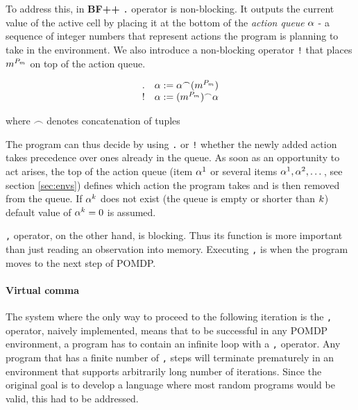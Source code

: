 To address this, in \textbf{BF++} \texttt{.} operator is non-blocking.
It outputs the current value of the active cell by placing it at the bottom of the \textit{action queue} $\alpha$ - a sequence of integer numbers that represent actions the program is planning to take in the environment. We also introduce a non-blocking operator \texttt{!} that places $m^{P_m}$ on top of the action queue.

\begin{equation}
    \begin{array}{cc}
         . & \alpha := \alpha^\frown (m^{P_m}) \\
         ! & \alpha := (m^{P_m})^\frown \alpha
    \end{array}
\end{equation}

where $\frown$ denotes concatenation of tuples

The program can thus decide by using \texttt{.} or \texttt{!} whether the newly added action takes precedence over ones already in the queue.
As soon as an opportunity to act arises, the top of the action queue (item $\alpha^1$ or several items $\alpha^1,\alpha^2,\dots$, see section \ref{sec:envs}) defines which action the program takes and is then removed from the queue. 
If $\alpha^k$ does not exist (the queue is empty or shorter than $k$) default value of $\alpha^k=0$ is assumed.

\texttt{,} operator, on the other hand, is blocking. 
Thus its function is more important than just reading an observation into memory.
Executing \texttt{,} is when the program moves to the next step of POMDP.

\paragraph{Virtual comma}
\label{sec:virtualcomma}


The system where the only way to proceed to the following iteration is the \texttt{,} operator, naively implemented, means that to be successful in any POMDP environment, a program has to contain an infinite loop with a \texttt{,} operator.
Any program that has a finite number of \texttt{,} steps will terminate prematurely in an environment that supports arbitrarily long number of iterations.
Since the original goal is to develop a language where most random programs would be valid, this had to be addressed.

